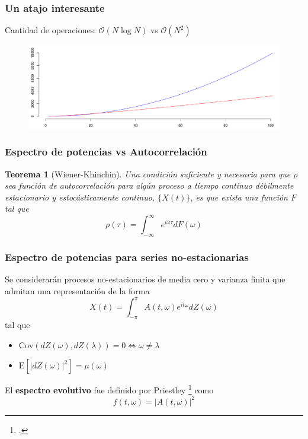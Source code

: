 \documentclass[serif,mathserif,professionalfont]{beamer}
\newtheorem{teorema}{Teorema}
\newcommand{\R}{\mathbb{R}}
\newcommand{\intR}{\int_{-\infty}^{\infty}}
\newcommand{\intPI}{\int_{-\pi}^{\pi}}
\newcommand{\E}[1]{\mathrm{E}\left[ #1 \right]}
\newcommand{\Cov}[1]{\mathrm{Cov}\left( #1 \right)}
\newcommand{\abso}[1]{\left| #1 \right|}
\begin{document}

\begin{frame}\frametitle{Un atajo interesante}
Cantidad de operaciones: $\mathcal{O}(N \log{}N)$ vs $\mathcal{O}(N^{2})$
\begin{figure}
\centering
\includegraphics[width=\linewidth]{./curso_scripts/N.png}
\end{figure}
\end{frame}


\begin{frame}\frametitle{Espectro de potencias vs Autocorrelación}
\begin{teorema}[Wiener-Khinchin]
Una condición suficiente y necesaria para que $\rho$ sea función de autocorrelación para 
algún proceso a tiempo continuo débilmente estacionario y estocásticamente continuo, 
$\{X(t)\}$,  es que exista una función $F$ tal que
\begin{equation*}
\rho(\tau) = \intR e^{i \omega \tau} dF(\omega)
\end{equation*}
\end{teorema}
\end{frame}


\begin{frame}\frametitle{Espectro de potencias para series no-estacionarias}
Se considerarán procesos no-estacionarios \alert{de media cero y varianza finita} que admitan una 
representación de la forma
\begin{equation*}
X(t) = \intPI A(t,\omega) e^{i t \omega} dZ(\omega)
\end{equation*}
tal que 
\begin{itemize}
\item $\Cov{dZ(\omega),dZ(\lambda)} = 0 \Leftrightarrow \omega \neq \lambda$
\item $\E{\abso{dZ(\omega)}^{2}} = \mu(\omega)$
\end{itemize}

El \textbf{espectro evolutivo} fue definido por Priestley \footcite{Priestley65} como
\begin{equation*}
f(t,\omega) = \abso{A(t,\omega)}^{2}
\end{equation*}
\end{frame}
\end{document}

